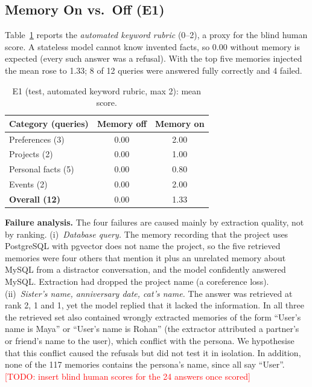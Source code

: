 \documentclass[conference]{IEEEtran}
\newcommand{\todo}[1]{\textcolor{red}{[TODO: #1]}}
\begin{document}
\subsection{Memory On vs.\ Off (E1)}
Table~\ref{tab:e1} reports the \emph{automated keyword rubric} (0--2), a proxy
for the blind human score. A stateless model cannot know invented facts, so 0.00
without memory is expected (every such answer was a refusal). With the top five
memories injected the mean rose to 1.33; 8 of 12 queries were answered fully
correctly and 4 failed.

\begin{table}[t]
\caption{E1 (test, automated keyword rubric, max 2): mean score.}
\label{tab:e1}
\centering\footnotesize
\begin{tabular}{@{}lcc@{}}
\toprule
Category (queries) & Memory off & Memory on \\
\midrule
Preferences (3)    & 0.00 & 2.00 \\
Projects (2)       & 0.00 & 1.00 \\
Personal facts (5) & 0.00 & 0.80 \\
Events (2)         & 0.00 & 2.00 \\
\midrule
\textbf{Overall (12)} & 0.00 & 1.33 \\
\bottomrule
\end{tabular}
\end{table}

\textbf{Failure analysis.} The four failures are caused mainly by extraction
quality, not by ranking. (i)~\emph{Database query.} The memory recording that the
project uses PostgreSQL with pgvector does not name the project, so the five
retrieved memories were four others that mention it plus an unrelated memory about
MySQL from a distractor conversation, and the model confidently answered MySQL.
Extraction had dropped the project name (a coreference loss). (ii)~\emph{Sister's
name, anniversary date, cat's name.} The answer was retrieved at rank 2, 1 and 1,
yet the model replied that it lacked the information. In all three the retrieved
set also contained wrongly extracted memories of the form ``User's name is Maya''
or ``User's name is Rohan'' (the extractor attributed a partner's or friend's name
to the user), which conflict with the persona. We hypothesise that this conflict
caused the refusals but did not test it in isolation. In addition, none of the 117
memories contains the persona's name, since all say ``User''. \todo{insert blind
human scores for the 24 answers once scored}
\end{document}
